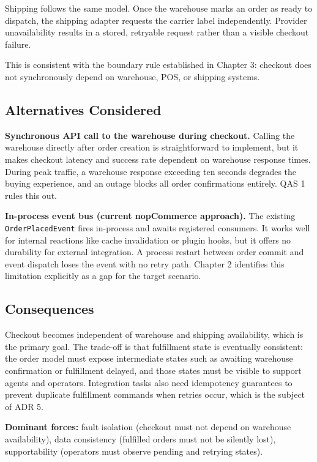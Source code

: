 Shipping follows the same model. Once the warehouse marks an order as ready to dispatch, the
shipping adapter requests the carrier label independently. Provider unavailability results in a
stored, retryable request rather than a visible checkout failure.

This is consistent with the boundary rule established in Chapter 3: checkout does not
synchronously depend on warehouse, POS, or shipping systems.

\subsection{Alternatives Considered}

\textbf{Synchronous API call to the warehouse during checkout.} Calling the warehouse directly
after order creation is straightforward to implement, but it makes checkout latency and success
rate dependent on warehouse response times. During peak traffic, a warehouse response exceeding
ten seconds degrades the buying experience, and an outage blocks all order confirmations
entirely. QAS 1 rules this out.

\textbf{In-process event bus (current nopCommerce approach).} The existing
\texttt{OrderPlacedEvent} fires in-process and awaits registered consumers. It works well for
internal reactions like cache invalidation or plugin hooks, but it offers no durability for
external integration. A process restart between order commit and event dispatch loses the event
with no retry path. Chapter 2 identifies this limitation explicitly as a gap for the target
scenario.

\subsection{Consequences}

Checkout becomes independent of warehouse and shipping availability, which is the primary goal.
The trade-off is that fulfillment state is eventually consistent: the order model must expose
intermediate states such as awaiting warehouse confirmation or fulfillment delayed, and those
states must be visible to support agents and operators. Integration tasks also need idempotency
guarantees to prevent duplicate fulfillment commands when retries occur, which is the subject
of ADR 5.

\textbf{Dominant forces:} fault isolation (checkout must not depend on warehouse availability),
data consistency (fulfilled orders must not be silently lost), supportability (operators must
observe pending and retrying states).

